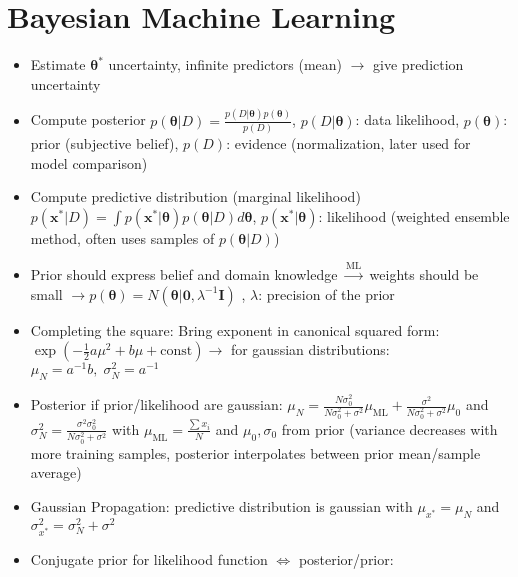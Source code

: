 \documentclass[11pt]{scrartcl}
\begin{document}
\section{Bayesian Machine Learning}

\begin{itemize}
    \item Estimate \( \bm{\theta}^* \) uncertainty, infinite predictors (mean) 
        \( \rightarrow \) give prediction uncertainty
    \item Compute posterior \( p ( \bm{\theta} | D ) = 
        \frac{p ( D | \bm{\theta} ) p ( \bm{\theta} )}{p ( D )} \), 
        \( p ( D | \bm{\theta} ) \): data likelihood, \( p ( \bm{\theta} ) \): prior 
        (subjective belief), \( p ( D ) \): evidence (normalization, later used for model 
        comparison)
    \item Compute predictive distribution (marginal likelihood) \( p ( \bm{x}^* | D ) = 
        \int p ( \bm{x}^* | \bm{\theta} ) p ( \bm{\theta} | D ) d \bm{\theta} \), 
        \( p ( \bm{x}^* | \bm{\theta} ) \): likelihood (weighted ensemble method, often uses 
        samples of \( p ( \bm{\theta} | D ) \))
    \item Prior should express belief and domain knowledge \( \xrightarrow{\mathrm{ML}} \) 
        weights should be small \( \rightarrow p ( \bm{\theta} ) = 
        N ( \bm{\theta} | \bm{0}, \lambda^{- 1} \bm{I} ) \) , \( \lambda \): precision of the 
        prior
    \item Completing the square: Bring exponent in canonical squared form: 
        \( \exp ( - \frac{1}{2} a \mu^2 + b \mu + \mathrm{const} ) \rightarrow \) for gaussian 
        distributions: \( \mu_N = a^{- 1} b, \; \sigma^2_N = a^{- 1} \)
    \item Posterior if prior/likelihood are gaussian: \( \mu_N = 
        \frac{N \sigma_0^2}{N \sigma_0^2 + \sigma^2} \mu_{\mathrm{ML}} + 
        \frac{\sigma^2}{N \sigma_0^2 + \sigma^2} \mu_0 \) and \( \sigma_N^2 = 
        \frac{\sigma^2 \sigma_0^2}{N \sigma_0^2 + \sigma^2} \) with \( \mu_{\mathrm{ML}} = 
        \frac{\sum x_i}{N} \) and \( \mu_0, \sigma_0 \) from prior (variance decreases with 
        more training samples, posterior interpolates between prior mean/sample average)
    \item Gaussian Propagation: predictive distribution is gaussian with \( \mu_{x^*} = \mu_N \) and 
        \( \sigma_{x^*}^2 = \sigma_N^2 + \sigma^2 \)
    \item Conjugate prior for likelihood function \( \Leftrightarrow \) posterior/prior: 

\end{itemize}
\end{document}
